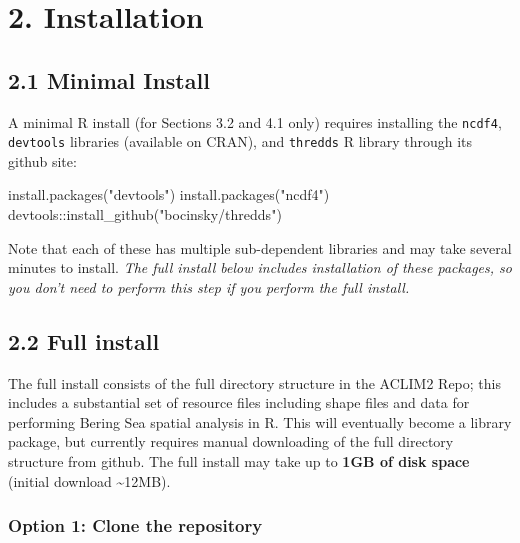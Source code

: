 \documentclass[
]{article}
\newenvironment{Shaded}{\begin{snugshade}}{\end{snugshade}}
\newcommand{\FunctionTok}[1]{\textcolor[rgb]{0.00,0.00,0.00}{#1}}
\newcommand{\NormalTok}[1]{#1}
\newcommand{\SpecialCharTok}[1]{\textcolor[rgb]{0.00,0.00,0.00}{#1}}
\newcommand{\StringTok}[1]{\textcolor[rgb]{0.31,0.60,0.02}{#1}}
\begin{document}
\hypertarget{installation}{%
\section{2. Installation}\label{installation}}

\hypertarget{minimal-install}{%
\subsection{2.1 Minimal Install}\label{minimal-install}}

A minimal R install (for Sections 3.2 and 4.1 only) requires installing
the \texttt{ncdf4}, \texttt{devtools} libraries (available on CRAN), and
\texttt{thredds} R library through its github site:

\begin{Shaded}
\begin{Highlighting}[]
    \FunctionTok{install.packages}\NormalTok{(}\StringTok{"devtools"}\NormalTok{)}
    \FunctionTok{install.packages}\NormalTok{(}\StringTok{"ncdf4"}\NormalTok{)}
\NormalTok{    devtools}\SpecialCharTok{::}\FunctionTok{install\_github}\NormalTok{(}\StringTok{"bocinsky/thredds"}\NormalTok{)}
\end{Highlighting}
\end{Shaded}

Note that each of these has multiple sub-dependent libraries and may
take several minutes to install. \emph{The full install below includes
installation of these packages, so you don't need to perform this step
if you perform the full install.}

\hypertarget{full-install}{%
\subsection{2.2 Full install}\label{full-install}}

The full install consists of the full directory structure in the ACLIM2
Repo; this includes a substantial set of resource files including shape
files and data for performing Bering Sea spatial analysis in R. This
will eventually become a library package, but currently requires manual
downloading of the full directory structure from github. The full
install may take up to \textbf{1GB of disk space} (initial download
\textasciitilde12MB).

\hypertarget{option-1-clone-the-repository}{%
\subsubsection{Option 1: Clone the
repository}\label{option-1-clone-the-repository}}
\end{document}
